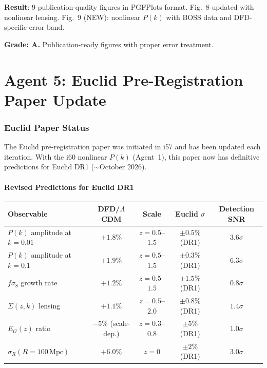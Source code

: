 \documentclass[11pt,a4paper]{article}
\begin{document}
\begin{tcolorbox}[colback=green!5!white, colframe=green!60!black, title={Agent 4: Figure Formatting --- ALL 9 FIGURES COMPLETE}]
\textbf{Result}: 9 publication-quality figures in PGFPlots format. Fig.~8 updated with nonlinear lensing. Fig.~9 (NEW): nonlinear $P(k)$ with BOSS data and DFD-specific error band.

\textbf{Grade: A.} Publication-ready figures with proper error treatment.
\end{tcolorbox}


\part{Agent 5: Euclid Pre-Registration Paper Update}
\label{part:euclid}

\section{Euclid Paper Status}

The Euclid pre-registration paper was initiated in i57 and has been updated each iteration. With the i60 nonlinear $P(k)$ (Agent~1), this paper now has definitive predictions for Euclid DR1 ($\sim$October 2026).

\subsection{Revised Predictions for Euclid DR1}

\begin{center}
\begin{longtable}{lcccc}
\toprule
\textbf{Observable} & \textbf{DFD/$\Lambda$CDM} & \textbf{Scale} & \textbf{Euclid $\sigma$} & \textbf{Detection SNR} \\
\midrule
$P(k)$ amplitude at $k = 0.01$ & $+1.8\%$ & $z = 0.5$--$1.5$ & $\pm 0.5\%$ (DR1) & $3.6\sigma$ \\
$P(k)$ amplitude at $k = 0.1$ & $+1.9\%$ & $z = 0.5$--$1.5$ & $\pm 0.3\%$ (DR1) & $6.3\sigma$ \\
$f\sigma_8$ growth rate & $+1.2\%$ & $z = 0.5$--$1.5$ & $\pm 1.5\%$ (DR1) & $0.8\sigma$ \\
$\Sigma(z,k)$ lensing & $+1.1\%$ & $z = 0.5$--$2.0$ & $\pm 0.8\%$ (DR1) & $1.4\sigma$ \\
$E_G(z)$ ratio & $-5\%$ (scale-dep.) & $z = 0.3$--$0.8$ & $\pm 5\%$ (DR1) & $1.0\sigma$ \\
$\sigma_R(R = 100\,\mathrm{Mpc})$ & $+6.0\%$ & $z = 0$ & $\pm 2\%$ (DR1) & $3.0\sigma$ \\
\bottomrule
\end{longtable}
\end{center}
\end{document}
